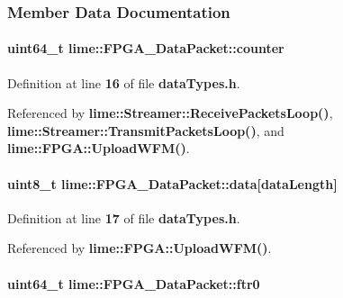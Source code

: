 \subsubsection{Member Data Documentation}
\paragraph[{counter}]{\setlength{\rightskip}{0pt plus 5cm}uint64\+\_\+t lime\+::\+F\+P\+G\+A\+\_\+\+Data\+Packet\+::counter}\label{structlime_1_1FPGA__DataPacket_a7103be181090ccf3c4b9f5e9f8758dea}


Definition at line {\bf 16} of file {\bf data\+Types.\+h}.



Referenced by {\bf lime\+::\+Streamer\+::\+Receive\+Packets\+Loop()}, {\bf lime\+::\+Streamer\+::\+Transmit\+Packets\+Loop()}, and {\bf lime\+::\+F\+P\+G\+A\+::\+Upload\+W\+F\+M()}.

\paragraph[{data}]{\setlength{\rightskip}{0pt plus 5cm}uint8\+\_\+t lime\+::\+F\+P\+G\+A\+\_\+\+Data\+Packet\+::data[{\bf data\+Length}]}\label{structlime_1_1FPGA__DataPacket_a94f04a0f69f9a533a18040abc207ee58}


Definition at line {\bf 17} of file {\bf data\+Types.\+h}.



Referenced by {\bf lime\+::\+F\+P\+G\+A\+::\+Upload\+W\+F\+M()}.

\paragraph[{ftr0}]{\setlength{\rightskip}{0pt plus 5cm}uint64\+\_\+t lime\+::\+F\+P\+G\+A\+\_\+\+Data\+Packet\+::ftr0}\label{structlime_1_1FPGA__DataPacket_a594c9a84b6e68fc01a3007949e1c6a51}


